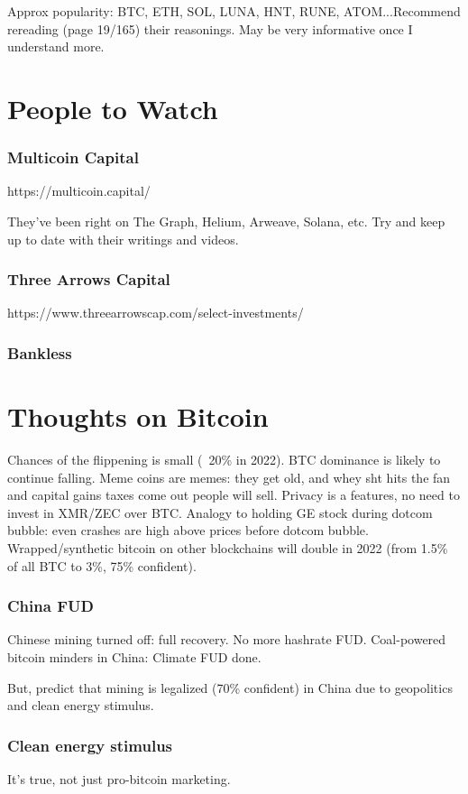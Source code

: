\documentclass{../notes}
\begin{document}
Approx popularity: BTC, ETH, SOL, LUNA, HNT, RUNE, ATOM...Recommend rereading (page 19/165) their reasonings. May be very informative once I understand more. 

\part{People to Watch}
\section{Multicoin Capital}
https://multicoin.capital/

They've been right on The Graph, Helium, Arweave, Solana, etc. Try and keep up to date with their writings and videos. 

\section{Three Arrows Capital}
https://www.threearrowscap.com/select-investments/

\section{Bankless}


\part{Thoughts on Bitcoin}
Chances of the flippening is small (~20\% in 2022). BTC dominance is likely to continue falling. Meme coins are memes: they get old, and whey sht hits the fan and capital gains taxes come out people will sell. Privacy is a features, no need to invest in XMR/ZEC over BTC. Analogy to holding GE stock during dotcom bubble: even crashes are high above prices before dotcom bubble. Wrapped/synthetic bitcoin on other blockchains will double in 2022 (from 1.5\% of all BTC to 3\%, 75\% confident). 

\section{China FUD}
Chinese mining turned off: full recovery. No more hashrate FUD. Coal-powered bitcoin minders in China: Climate FUD done. 

But, predict that mining is legalized (70\% confident) in China due to geopolitics and clean energy stimulus. 

\section{Clean energy stimulus}
It's true, not just pro-bitcoin marketing. 
\end{document}
